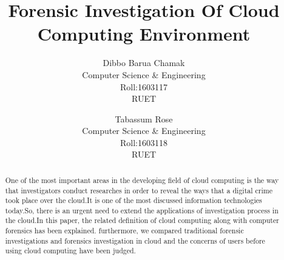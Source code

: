 \documentclass[conference,one column]{IEEEtran}
\begin{document}
\title{Forensic Investigation Of Cloud Computing Environment}

\author{Dibbo Barua Chamak \\ Computer Science \& Engineering\\Roll:1603117\\RUET
\and
  Tabassum Rose \\ Computer Science \& Engineering\\Roll:1603118\\RUET
}

\maketitle
\begin{abstract}
One of the most important areas in the developing field of cloud computing is the way that investigators conduct researches in order to reveal the ways that a digital crime took place over the cloud.It is one of the most discussed information technologies today.So, there is an urgent need to extend the applications of investigation process in the cloud.In this paper, the related definition of cloud  computing along with computer forensics has been explained. furthermore, we compared traditional forensic investigations and forensics investigation in cloud and the concerns of users before using cloud computing have been judged.
\end{abstract}
\end{document}
